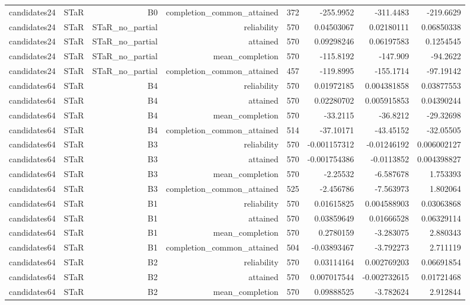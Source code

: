 \begin{longtable}{llrrrrrr}
candidates24 & STaR & B0 & completion\_common\_attained & 372 & -255.9952 & -311.4483 & -219.6629 \\
candidates24 & STaR & STaR\_no\_partial & reliability & 570 & 0.04503067 & 0.02180111 & 0.06850338 \\
candidates24 & STaR & STaR\_no\_partial & attained & 570 & 0.09298246 & 0.06197583 & 0.1254545 \\
candidates24 & STaR & STaR\_no\_partial & mean\_completion & 570 & -115.8192 & -147.909 & -94.2622 \\
candidates24 & STaR & STaR\_no\_partial & completion\_common\_attained & 457 & -119.8995 & -155.1714 & -97.19142 \\
candidates64 & STaR & B4 & reliability & 570 & 0.01972185 & 0.004381858 & 0.03877553 \\
candidates64 & STaR & B4 & attained & 570 & 0.02280702 & 0.005915853 & 0.04390244 \\
candidates64 & STaR & B4 & mean\_completion & 570 & -33.2115 & -36.8212 & -29.32698 \\
candidates64 & STaR & B4 & completion\_common\_attained & 514 & -37.10171 & -43.45152 & -32.05505 \\
candidates64 & STaR & B3 & reliability & 570 & -0.001157312 & -0.01246192 & 0.006002127 \\
candidates64 & STaR & B3 & attained & 570 & -0.001754386 & -0.0113852 & 0.004398827 \\
candidates64 & STaR & B3 & mean\_completion & 570 & -2.25532 & -6.587678 & 1.753393 \\
candidates64 & STaR & B3 & completion\_common\_attained & 525 & -2.456786 & -7.563973 & 1.802064 \\
candidates64 & STaR & B1 & reliability & 570 & 0.01615825 & 0.004588903 & 0.03063868 \\
candidates64 & STaR & B1 & attained & 570 & 0.03859649 & 0.01666528 & 0.06329114 \\
candidates64 & STaR & B1 & mean\_completion & 570 & 0.2780159 & -3.283075 & 2.880343 \\
candidates64 & STaR & B1 & completion\_common\_attained & 504 & -0.03893467 & -3.792273 & 2.711119 \\
candidates64 & STaR & B2 & reliability & 570 & 0.03114164 & 0.002769203 & 0.06691854 \\
candidates64 & STaR & B2 & attained & 570 & 0.007017544 & -0.002732615 & 0.01721468 \\
candidates64 & STaR & B2 & mean\_completion & 570 & 0.09888525 & -3.782624 & 2.912844 \\

\end{longtable}
